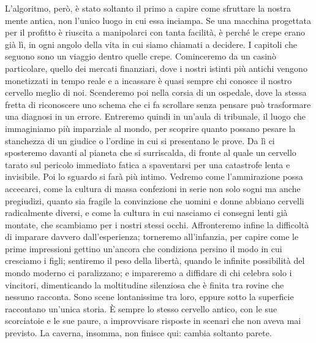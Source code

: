 L'algoritmo, però, è stato soltanto il primo a capire come sfruttare la nostra mente antica, non l'unico luogo in cui essa inciampa. Se una macchina progettata per il profitto è riuscita a manipolarci con tanta facilità, è perché le crepe erano già lì, in ogni angolo della vita in cui siamo chiamati a decidere. I capitoli che seguono sono un viaggio dentro quelle crepe.
Cominceremo da un casinò particolare, quello dei mercati finanziari, dove i nostri istinti più antichi vengono monetizzati in tempo reale e a incassare è quasi sempre chi conosce il nostro cervello meglio di noi.
Scenderemo poi nella corsia di un ospedale, dove la stessa fretta di riconoscere uno schema che ci fa scrollare senza pensare può trasformare una diagnosi in un errore. Entreremo quindi in un'aula di tribunale, il luogo che immaginiamo più imparziale al mondo, per scoprire quanto possano pesare la stanchezza di un giudice o l'ordine in cui si presentano le prove. Da lì ci sposteremo davanti al pianeta che si surriscalda, di fronte al quale un cervello tarato sul pericolo immediato fatica a spaventarsi per una catastrofe lenta e invisibile.
Poi lo sguardo si farà più intimo. Vedremo come l'ammirazione possa accecarci, come la cultura di massa confezioni in serie non solo sogni ma anche pregiudizi, quanto sia fragile la convinzione che uomini e donne abbiano cervelli radicalmente diversi, e come la cultura in cui nasciamo ci consegni lenti già montate, che scambiamo per i nostri stessi occhi.
Affronteremo infine la difficoltà di imparare davvero dall'esperienza; torneremo all'infanzia, per capire come le prime impressioni gettino un'ancora che condiziona persino il modo in cui cresciamo i figli; sentiremo il peso della libertà, quando le infinite possibilità del mondo moderno ci paralizzano; e impareremo a diffidare di chi celebra solo i vincitori, dimenticando la moltitudine silenziosa che è finita tra rovine che nessuno racconta.
Sono scene lontanissime tra loro, eppure sotto la superficie raccontano un'unica storia. È sempre lo stesso cervello antico, con le sue scorciatoie e le sue paure, a improvvisare risposte in scenari che non aveva mai previsto. La caverna, insomma, non finisce qui: cambia soltanto parete.
